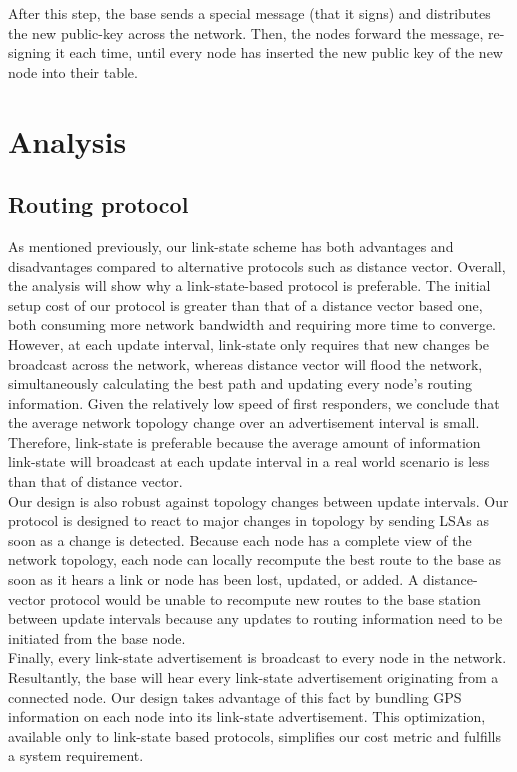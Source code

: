 \documentclass[letterpaper]{article}
\begin{document}
After this step, the base sends a special message (that it signs) and distributes the new public-key across the network. 
Then, the nodes forward the message, re-signing it each time, until every node has inserted the new public key of the new node into their table.

\section{Analysis}

\subsection{Routing protocol}

As mentioned previously, our link-state scheme has both advantages and disadvantages compared to alternative protocols
such as distance vector. Overall, the analysis will show why a link-state-based protocol is preferable. The initial
setup cost of our protocol is greater than that of a distance vector based one, both consuming more network bandwidth
and requiring more time to converge. However, at each update interval, link-state only requires that new changes
be broadcast across the network, whereas distance vector will flood the network, simultaneously calculating the 
best path and updating every node's routing information. Given the relatively low speed of first responders, we 
conclude that the average network topology change over an advertisement interval is small. Therefore, link-state is
preferable because the average amount of information link-state will broadcast at each update interval in a real world
scenario is less than that of distance vector.
\\

\noindent Our design is also robust against topology changes between update intervals. Our protocol is designed to react
to major changes in topology by sending LSAs as soon as a change is detected. Because each node has a complete view of 
the network topology, each node can locally recompute the best route to the base as soon as it hears a link or node has 
been lost, updated, or added. A distance-vector protocol would be unable to recompute new routes to the base station
between update intervals because any updates to routing information need to be initiated from the base node.
\\

\noindent Finally, every link-state advertisement is broadcast to every node in the network. Resultantly, the base
will hear every link-state advertisement originating from a connected node. Our design takes advantage of this fact by
bundling GPS information on each node into its link-state advertisement. This optimization, available only to link-state
based protocols, simplifies our cost metric and fulfills a system requirement. 
\end{document}
